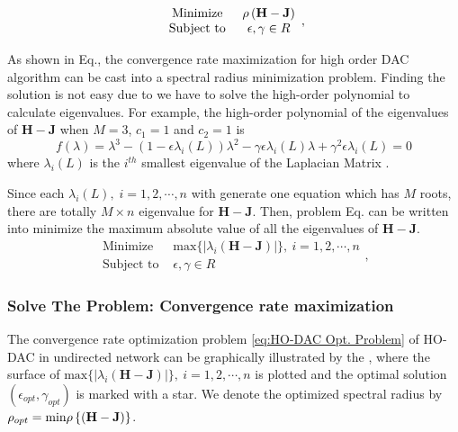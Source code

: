 \begin{equation}
\begin{array}{cc}
\mbox{\mbox{Minimize }} & \rho\left(\mathbf{H}-\mathbf{J}\right)\\
\mbox{Subject to } & \epsilon,\gamma\in R
\end{array},\label{eq: High order spectral radius problem}
\end{equation}


As shown in Eq.,
the convergence rate maximization for high order DAC algorithm can
be cast into a spectral radius minimization problem. Finding the solution
is not easy due to we have to solve the high-order polynomial to calculate
eigenvalues. For example, the high-order polynomial of the eigenvalues
of $\mathbf{H-J}$ when $M=3$, $c_{1}=1$ and $c_{2}=1$ is 
\begin{equation}
f(\lambda)=\lambda^{3}-\left(1-\epsilon\lambda_{i}\left(L\right)\right)\lambda^{2}-\gamma\epsilon\lambda_{i}\left(L\right)\lambda+\gamma^{2}\epsilon\lambda_{i}\left(L\right)=0\label{eq: eigenvalue equation of H-J}
\end{equation}
where $\lambda_{i}(L)$ is the $i^{th}$ smallest eigenvalue of the
Laplacian Matrix \cite{Xiong2010}. 

Since each $\lambda_{i}(L),\; i=1,2,\cdots,n$ with generate one equation
which has $M$ roots, there are totally $M\times n$ eigenvalue for
$\mathbf{H-J}$. Then, problem Eq.
can be written into minimize the maximum absolute value of all the
eigenvalues of $\mathbf{H-J}$. 
\begin{equation}
\begin{array}{cc}
\mbox{Minimize } & \mbox{max}\{\left|\lambda_{i}\left(\mathbf{H-J}\right)\right|\},\: i=1,2,\cdots,n\\
\mbox{Subject to } & \epsilon,\gamma\in R
\end{array},\label{eq:HO-DAC Opt. Problem}
\end{equation}



\subsubsection{Solve The Problem: Convergence rate maximization}

The convergence rate optimization problem \ref{eq:HO-DAC Opt. Problem}
of HO-DAC in undirected network can be graphically illustrated by
the , where the surface of $\mbox{max}\{\left|\lambda_{i}\left(\mathbf{H-J}\right)\right|\},\: i=1,2,\cdots,n$
is plotted and the optimal solution $\left(\epsilon{}_{opt},\gamma_{opt}\right)$
is marked with a star. We denote the optimized spectral radius by
$\rho_{opt}=\mbox{\mbox{min}}\rho\left\{ \left(\mathbf{H}-\mathbf{J}\right)\right\} $. 

